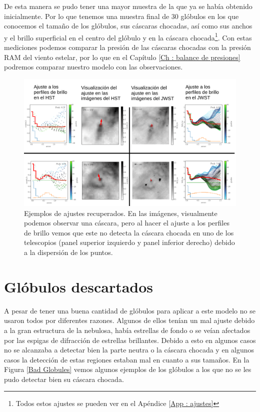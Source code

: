 \documentclass{book}
\begin{document}
De esta manera se pudo tener una mayor muestra de la que ya se había
obtenido inicialmente. Por lo que tenemos una muestra final de 30
glóbulos en los que conocemos el tamaño de los glóbulos, sus cáscaras
chocadas, así como sus anchos y el brillo superficial en el centro del
glóbulo y en la cáscara chocada\footnote{Todos estos ajustes se pueden
  ver en el Apéndice \ref{App : ajustes}}. Con estas mediciones
podemos comparar la presión de las cáscaras chocadas con la presión
RAM del viento estelar, por lo que en el Capítulo \ref{Ch : balance de
  presiones} podremos comparar nuestro modelo con las observaciones.

\begin{figure}[htb]
    \centering
    \includegraphics[width=\textwidth]{imagenes_corregidas/recuperados_aj.pdf}
    \caption{Ejemplos de ajustes recuperados. En las imágenes,
      visualmente podemos observar una cáscara, pero al hacer el
      ajuste a los perfiles de brillo vemos que este no detecta la
      cáscara chocada en uno de los telescopios (panel superior
      izquierdo y panel inferior derecho) debido a la dispersión de
      los puntos.}
    \label{Recuperados Globulos}
\end{figure}

\section{Glóbulos descartados}\label{Bad globules}

A pesar de tener una buena cantidad de glóbulos para aplicar a este
modelo no se usaron todos por diferentes razones. Algunos de ellos
tenían un mal ajuste debido a la gran estructura de la nebulosa, había
estrellas de fondo o se veían afectados por las espigas de difracción
de estrellas brillantes. Debido a esto en algunos casos no se
alcanzaba a detectar bien la parte neutra o la cáscara chocada y en
algunos casos la detección de estas regiones estaban mal en cuanto a
sus tamaños. En la Figura \ref{Bad Globules} vemos algunos ejemplos de
los glóbulos a los que no se les pudo detectar bien su cáscara
chocada.
\end{document}
